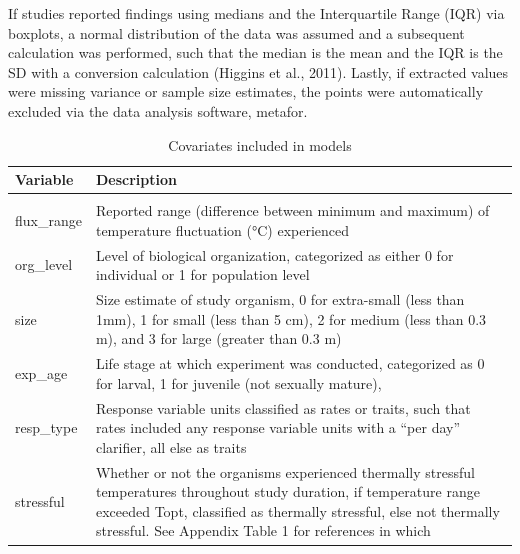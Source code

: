 \documentclass[12pt,twoside]{reedthesis}
\begin{document}
If studies reported findings using medians and the Interquartile Range (IQR) via boxplots, a normal distribution of the data was assumed and a subsequent calculation was performed, such that the median is the mean and the IQR is the SD with a conversion calculation (Higgins et al., 2011). Lastly, if extracted values were missing variance or sample size estimates, the points were automatically excluded via the data analysis software, metafor.

\clearpage
\begin{table}[!h]

\caption{\label{tab:unnamed-chunk-9}Covariates included in models}
\centering
\begin{tabular}[t]{l>{\raggedright\arraybackslash}p{8cm}}
\toprule
\textbf{Variable} & \textbf{Description}\\
\midrule
\cellcolor{gray!6}{mean\_temp\_constant} & \cellcolor{gray!6}{Reported mean temperature (°C) in study}\\
flux\_range & Reported range (difference between minimum 
                                     and maximum) of temperature fluctuation (°C) experienced\\
org\_level & Level of biological organization, categorized
                                     as either 0 for individual or 1 for population level
\cellcolor{gray!6}{                                     responses}\\
size & Size estimate of study organism, 0 for extra-small (less than 1mm),
                                     1 for small (less than 5 cm), 2 for medium (less than 0.3 m), and 3
                                     for large (greater than 0.3 m)\\
exp\_age & Life stage at which experiment was conducted, 
                                     categorized as 0 for larval, 1 for juvenile (not sexually mature),
\cellcolor{gray!6}{                                     and 2 for adult}\\
\addlinespace
resp\_type & Response variable units classified as rates or traits, 
                                     such that rates included any response variable units with a
                                     “per day” clarifier, all else as traits\\
stressful & Whether or not the organisms experienced thermally stressful 
                                     temperatures throughout study duration, if temperature range 
                                     exceeded Topt, classified as thermally stressful, else not
                                     thermally stressful. See Appendix Table 1 for references in which
\cellcolor{gray!6}{                                     organisms’ thermal stress metrics were included}\\
\bottomrule
\end{tabular}
\end{table}
\clearpage
\end{document}
